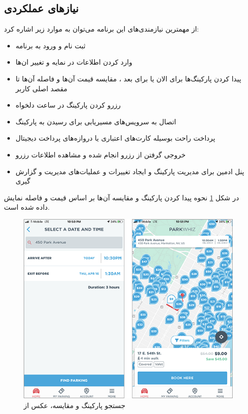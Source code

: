 \subsection{نیازهای عملکردی }
از مهمترین نیازمندی‌های این برنامه می‌توان به موارد زیر اشاره کرد:

\begin{itemize}
\item
ثبت نام و ورود به برنامه
\item
وارد کردن اطلاعات در نمایه و تغییر ان‌ها
\item
پیدا کردن پارکینگ‌ها برای الان یا برای بعد ، مقایسه قیمت آن‌ها و فاصله آن‌ها تا مقصد اصلی کاربر
\item
رزرو کردن پارکینگ در ساعت دلخواه 
\item
اتصال به سرویس‌های مسیریابی برای رسیدن به پارکینگ
\item
پرداخت راحت بوسیله کارت‌های اعتباری یا دروازه‌های پرداخت‌ دیجیتال
\item
خروجی گرفتن از رزرو انجام شده و مشاهده اطلاعات رزرو
\item
پنل ادمین برای مدیریت پارکینگ و ایجاد تغییرات و  عملیات‌های مدیریت و گزارش گیری 
\end{itemize}

در شکل \ref{fig: parkwhiz1} نحوه پیدا کردن پارکینگ و مقایسه آن‌ها بر اساس قیمت و فاصله نمایش داده شده است.



\begin{figure}[htb]
\centering
\includegraphics[scale=0.5]{parkwhiz1.png}
\caption{جستجو پارکینگ و مقایسه، عکس از \cite{parkwhiz_ux}}
\label{fig: parkwhiz1}
\end{figure}
















